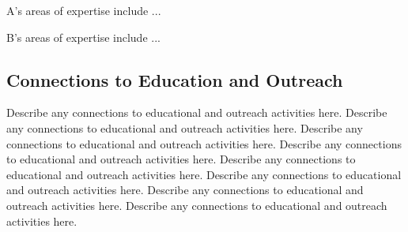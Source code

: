 A's areas of expertise include ...

B's areas of expertise include ...

\subsection{Connections to Education and Outreach}
\label{education}
%
Describe any connections to educational and outreach activities here.
Describe any connections to educational and outreach activities here.
Describe any connections to educational and outreach activities here.
Describe any connections to educational and outreach activities here.
Describe any connections to educational and outreach activities here.
Describe any connections to educational and outreach activities here.
Describe any connections to educational and outreach activities here.
Describe any connections to educational and outreach activities here.
